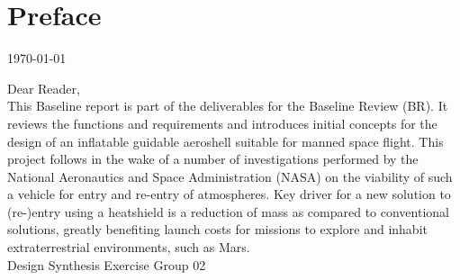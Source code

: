 \section*{Preface}\label{cha:preface}

\begin{flushright}
	\today
\end{flushright}

Dear Reader,	
\\ [1cm]
This Baseline report is part of the deliverables for the Baseline Review (BR). It reviews the functions and requirements and introduces initial concepts for the design of an inflatable guidable aeroshell suitable for manned space flight. This project follows in the wake of a number of investigations performed by the National Aeronautics and Space Administration (NASA) on the viability of such a vehicle for entry and re-entry of atmospheres. Key driver for a new solution to (re-)entry using a heatshield is a reduction of mass as compared to conventional solutions, greatly benefiting launch costs for missions to explore and inhabit extraterrestrial environments, such as Mars. 
\\ [1.5cm]
Design Synthesis Exercise Group 02